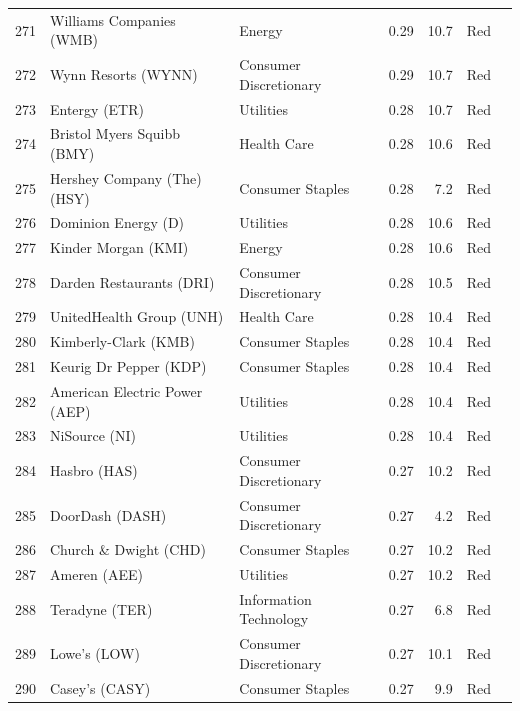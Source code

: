 \documentclass[11pt,a4paper]{article}
\begin{document}
{\begin{longtable}{r p{4.4cm} p{2.8cm} r r l l}
271 & Williams Companies (WMB) & Energy & 0.29 & 10.7 & \cellcolor[HTML]{F4B6B6}Red &  \\
272 & Wynn Resorts (WYNN) & Consumer Discretionary & 0.29 & 10.7 & \cellcolor[HTML]{F4B6B6}Red &  \\
273 & Entergy (ETR) & Utilities & 0.28 & 10.7 & \cellcolor[HTML]{F4B6B6}Red &  \\
274 & Bristol Myers Squibb (BMY) & Health Care & 0.28 & 10.6 & \cellcolor[HTML]{F4B6B6}Red &  \\
275 & Hershey Company (The) (HSY) & Consumer Staples & 0.28 & 7.2 & \cellcolor[HTML]{F4B6B6}Red &  \\
276 & Dominion Energy (D) & Utilities & 0.28 & 10.6 & \cellcolor[HTML]{F4B6B6}Red &  \\
277 & Kinder Morgan (KMI) & Energy & 0.28 & 10.6 & \cellcolor[HTML]{F4B6B6}Red &  \\
278 & Darden Restaurants (DRI) & Consumer Discretionary & 0.28 & 10.5 & \cellcolor[HTML]{F4B6B6}Red &  \\
279 & UnitedHealth Group (UNH) & Health Care & 0.28 & 10.4 & \cellcolor[HTML]{F4B6B6}Red &  \\
280 & Kimberly-Clark (KMB) & Consumer Staples & 0.28 & 10.4 & \cellcolor[HTML]{F4B6B6}Red &  \\
281 & Keurig Dr Pepper (KDP) & Consumer Staples & 0.28 & 10.4 & \cellcolor[HTML]{F4B6B6}Red &  \\
282 & American Electric Power (AEP) & Utilities & 0.28 & 10.4 & \cellcolor[HTML]{F4B6B6}Red &  \\
283 & NiSource (NI) & Utilities & 0.28 & 10.4 & \cellcolor[HTML]{F4B6B6}Red &  \\
284 & Hasbro (HAS) & Consumer Discretionary & 0.27 & 10.2 & \cellcolor[HTML]{F4B6B6}Red &  \\
285 & DoorDash (DASH) & Consumer Discretionary & 0.27 & 4.2 & \cellcolor[HTML]{F4B6B6}Red &  \\
286 & Church \& Dwight (CHD) & Consumer Staples & 0.27 & 10.2 & \cellcolor[HTML]{F4B6B6}Red &  \\
287 & Ameren (AEE) & Utilities & 0.27 & 10.2 & \cellcolor[HTML]{F4B6B6}Red &  \\
288 & Teradyne (TER) & Information Technology & 0.27 & 6.8 & \cellcolor[HTML]{F4B6B6}Red &  \\
289 & Lowe's (LOW) & Consumer Discretionary & 0.27 & 10.1 & \cellcolor[HTML]{F4B6B6}Red &  \\
290 & Casey's (CASY) & Consumer Staples & 0.27 & 9.9 & \cellcolor[HTML]{F4B6B6}Red &  \\

\end{longtable}}
\end{document}
